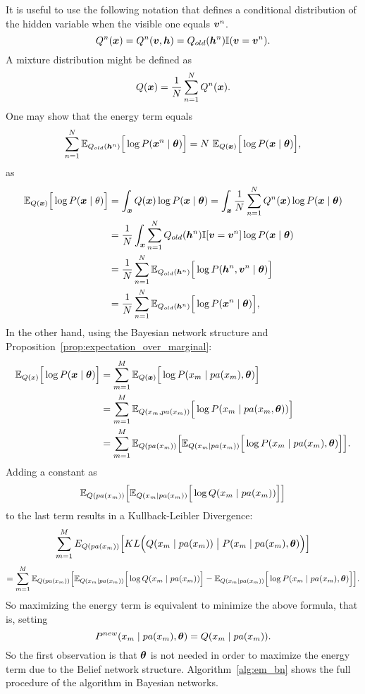 It is useful to use the following notation that defines a conditional distribution of the hidden variable when the visible one equals \(\bm{v}^{n}\).
\[
  Q^{n}(\bm{x}) = Q^{n}(\bm{v},\bm{h}) = Q_{old}(\bm{h}^{n}) \mathbb{I}(\bm{v} = \bm{v}^{n}).
\]
A mixture distribution might be defined as
\[
  Q(\bm{x}) = \frac{1}{N}\sum_{n = 1}^{N}Q^{n}(\bm{x}).
\]
One may show that the energy term equals
\[
  \sum_{n = 1}^{N}\E{Q_{old}(\bh^n)}{\log{P(\bx^{n} \mid \btheta)}} = N \ \E{Q(\bx)}{\log{P(\bx \mid \btheta)}},
\]
as
\[
  \begin{aligned}
    \mathbb{E}_{Q(\bm{x})}\Big[\log{P(\bm{x}\mid \theta)}\Big] &= \int_{\bm{x}}Q(\bm{x})\log{P(\bm{x}\mid \bm{\theta})} =  \int_{\bm{x}} \frac{1}{N}\sum_{n=1}^{N}Q^{n}(\bm{x})\log{P(\bm{x}\mid \bm{\theta})} \\
    &= \frac{1}{N} \int_{\bm{x}}\sum_{n=1}^{N}Q_{old}(\bm{h}^n)\mathbb{I}[\bm{v} = \bm{v}^{n}]\log{P(\bm{x}\mid \bm{\theta})}\\
    &= \frac{1}{N}\sum_{n = 1}^{N}\mathbb{E}_{Q_{old}(\bm{h}^n)}\Big[\log{P(\bm{h}^n, \bm{v}^{n} \mid \bm{\theta})}\Big]\\
    &= \frac{1}{N}\sum_{n = 1}^{N}\mathbb{E}_{Q_{old}(\bm{h}^n)}\Big[\log{P(\bm{x}^{n} \mid \bm{\theta})}\Big],
  \end{aligned}
\]
In the other hand, using the Bayesian network structure and Proposition~\ref{prop:expectation_over_marginal}:
\[
  \begin{aligned}
    \mathbb{E}_{Q(x)}\Big[\log{P(\bm{x}\mid \bm{\theta})}\Big] &= \sum_{m = 1}^{M}\mathbb{E}_{Q(\bm{x})}\Big[\log{P(x_{m} \mid pa(x_{m}), \bm{\theta})}\Big]\\
    &= \sum_{m = 1}^{M}\mathbb{E}_{Q(x_{m}, pa(x_{m}))}\Big[\log{P(x_{m} \mid pa(x_{m}, \bm{\theta}))}\Big]\\
    &= \sum_{m = 1}^{M}\mathbb{E}_{Q(pa(x_{m}))}\Big[ \mathbb{E}_{Q(x_{m}\mid pa(x_{m}))}\Big[ \log{P(x_{m} \mid pa(x_{m}), \bm{\theta})}\Big]\Big].
\end{aligned}
\]
Adding a constant as
\[
  \mathbb{E}_{Q(pa(x_{m}))}\Big[\mathbb{E}_{Q(x_{m}\mid pa(x_{m}))}\Big[\log{Q(x_{m} \mid pa(x_{m}))}\Big]\Big]
\]
to the last term results in a Kullback-Leibler Divergence:
\[
  \sum_{m = 1}^{M} E_{Q(pa(x_{m}))} \Big[ KL\Big(Q(x_{m}\mid pa(x_{m})) \bigm| P(x_{m} \mid pa(x_{m}), \bm{\theta})\Big)\Big]
\]
\[
  =\sum_{m = 1}^{M}\mathbb{E}_{Q(pa(x_{m}))}\Big[\mathbb{E}_{Q(x_{m}\mid pa(x_{m}))}\Big[\log{Q(x_{m} \mid pa(x_{m}))}\Big] - \mathbb{E}_{Q(x_{m}\mid pa(x_{m}))}\Big[\log{P(x_{m} \mid pa(x_{m}), \bm{\theta})}\Big]\Big].
\]
So maximizing the energy term is equivalent to minimize the above formula, that is, setting
\[
  P^{new}(x_{m} \mid pa(x_{m}), \bm{\theta}) = Q(x_{m} \mid pa(x_{m})).
\]
So the first observation is that \(\bm{\theta}\) is not needed in order to maximize the energy term due to the Belief network structure. Algorithm~\ref{alg:em_bn} shows the full procedure of the algorithm in Bayesian networks.

